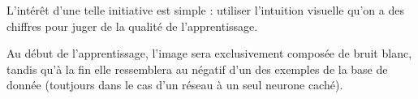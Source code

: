 \documentclass[a4paper,twoside]{report}
\begin{document}
                L'intérêt d'une telle initiative est simple : utiliser l'intuition visuelle qu'on a des chiffres pour juger de la qualité de l'apprentissage.

                Au début de l'apprentissage, l'image sera exclusivement composée de bruit blanc, tandis qu'à la fin elle ressemblera au négatif d'un des exemples de la base de donnée (toutjours dans le cas d'un réseau à un seul neurone caché).
\end{document}
